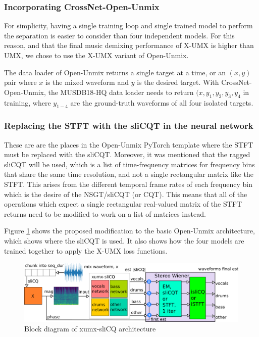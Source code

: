 \documentclass[report.tex]{subfiles}
\begin{document}
\subsubsection{Incorporating CrossNet-Open-Unmix}
\label{sec:xumxinc}

For simplicity, having a single training loop and single trained model to perform the separation is easier to consider than four independent models. For this reason, and that the final music demixing performance of X-UMX is higher than UMX, we chose to use the X-UMX variant of Open-Unmix.

The data loader of Open-Unmix returns a single target at a time, or an $(x, y)$ pair where $x$ is the mixed waveform and $y$ is the desired target. With CrossNet-Open-Unmix, the MUSDB18-HQ data loader needs to return $(x, y_{1}, y_{2}, y_{3}, y_{4}$ in training, where $y_{1-4}$ are the ground-truth waveforms of all four isolated targets.

\newpagefill

\subsubsection{Replacing the STFT with the sliCQT in the neural network}
\label{sec:replacestft}


These are are the places in the Open-Unmix PyTorch template where the STFT must be replaced with the sliCQT. Moreover, it was mentioned that the ragged sliCQT will be used, which is a list of time-frequency matrices for frequency bins that share the same time resolution, and not a single rectangular matrix like the STFT. This arises from the different temporal frame rates of each frequency bin which is the desire of the NSGT/sliCQT (or CQT). This means that all of the operations which expect a single rectangular real-valued matrix of the STFT returns need to be modified to work on a list of matrices instead.

Figure \ref{fig:xumxslicq} shows the proposed modification to the basic Open-Unmix architecture, which shows where the sliCQT is used. It also shows how the four models are trained together to apply the X-UMX loss functions.

\begin{figure}[ht]
	\centering
	\includegraphics[width=\textwidth]{./images-blockdiagrams/xumx_slicq_system_compressed_largefont.png}
	\caption{Block diagram of xumx-sliCQ architecture}
	\label{fig:xumxslicq}
\end{figure}
\end{document}
